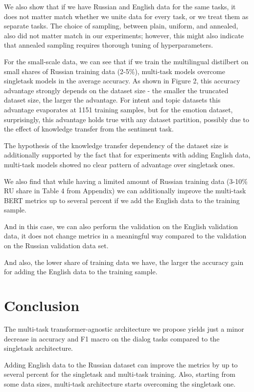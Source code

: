We also show that if we have Russian and English data for the same tasks, it does not matter match whether we unite data for every task, or we treat them as separate tasks. The choice of sampling, between plain, uniform, and annealed, also did not matter match in our experiments; however, this might also indicate that annealed sampling requires thorough tuning of hyperparameters.

For the small-scale data, we can see that if we train the multilingual distilbert on small shares of Russian training data (2-5\%), multi-task models overcome singletask models in the average accuracy. As shown in Figure 2, this accuracy advantage strongly depends on the dataset size - the smaller the truncated dataset size, the larger the advantage. For intent and topic datasets this advantage evaporates at 1151 training samples, but for the emotion dataset, surprisingly, this advantage holds true with any dataset partition, possibly due to the effect of knowledge transfer from the sentiment task.

The hypothesis of the knowledge transfer dependency of the dataset size is additionally supported by the fact that for experiments with adding English data, multi-task models showed no clear pattern of advantage over singletask ones.

We also find that while having a limited amount of Russian training data (3-10\% RU share in Table 4 from Appendix)  we can additionally improve the multi-task BERT metrics up to several percent if we add the English data to the training sample. 

And in this case, we can also perform the validation on the English validation data, it does not change metrics in a meaningful way compared to the validation on the Russian validation data set. 

And also, the lower share of training data we have, the larger the accuracy gain for adding the English data to the training sample.

\section{Conclusion}

The multi-task transformer-agnostic architecture we propose yields just a minor decrease in accuracy and F1 macro on the dialog tasks compared to the singletask architecture. 

Adding English data to the Russian dataset can improve the metrics by up to several percent for the singletask and multi-task training. Also, starting from some data sizes, multi-task architecture starts overcoming the singletask one.

